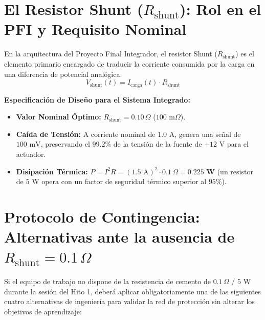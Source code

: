 \documentclass[11pt, a4paper]{article}
\begin{document}
\section{El Resistor Shunt ($R_{\text{shunt}}$): Rol en el PFI y Requisito Nominal}

En la arquitectura del Proyecto Final Integrador, el resistor Shunt ($R_{\text{shunt}}$) es el elemento primario encargado de traducir la corriente consumida por la carga en una diferencia de potencial analógica:
\begin{equation}
    V_{\text{shunt}}(t) = I_{\text{carga}}(t) \cdot R_{\text{shunt}}
\end{equation}

\textbf{Especificación de Diseño para el Sistema Integrado:}
\begin{itemize}
    \item \textbf{Valor Nominal Óptimo:} $R_{\text{shunt}} = 0.10\,\Omega$ ($100\text{ m}\Omega$).
    \item \textbf{Caída de Tensión:} A corriente nominal de $1.0\text{ A}$, genera una señal de $100\text{ mV}$, preservando el $99.2\%$ de la tensión de la fuente de $+12\text{ V}$ para el actuador.
    \item \textbf{Disipación Térmica:} $P = I^2 R = (1.5\text{ A})^2 \cdot 0.1\,\Omega = \mathbf{0.225\text{ W}}$ (un resistor de $5\text{ W}$ opera con un factor de seguridad térmico superior al $95\%$).
\end{itemize}

\newpage
\section{Protocolo de Contingencia: Alternativas ante la ausencia de $R_{\text{shunt}} = 0.1\,\Omega$}

Si el equipo de trabajo no dispone de la resistencia de cemento de $0.1\,\Omega$ / $5\text{ W}$ durante la sesión del Hito 1, deberá aplicar obligatoriamente una de las siguientes cuatro alternativas de ingeniería para validar la red de protección sin alterar los objetivos de aprendizaje:
\end{document}
